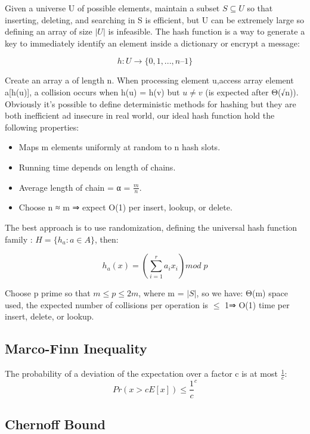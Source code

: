 Given a universe U of possible elements, maintain a subset $S \subseteq U$ so that inserting, deleting, and searching in S is efficient, but U can be extremely large so defining an array of size $| U |$ is infeasible.
The hash function is a way to generate a key to immediately identify an element inside a dictionary or encrypt a message:

\[h : U \rightarrow \{ 0, 1, ..., n – 1 \}\]

Create an array a of length n. When processing element u,access array element a[h(u)], a collision occurs when h(u) = h(v) but $u \neq v$ (is expected after Θ(√n)).\\
Obviously it's possible to define deterministic methods for hashing but they are both inefficient ad insecure in real world, our ideal hash function hold the following properties:\\

\begin{itemize}

    \item{Maps m elements uniformly at random to n hash slots.}
    \item{Running time depends on length of chains.}
    \item{Average length of chain = α = $\frac{m}{n}$.}
    \item{Choose n ≈ m ⇒ expect O(1) per insert, lookup, or delete.}

\end{itemize}

The best approach is to use randomization, defining the universal hash function family : $H = \{ h_{a} : a \in A \}$, then:

\[h_{a}(x) = (\sum_{i=1}^{r}a_{i}x_{i}) mod \;p\]

Choose p prime so that $m \leq p \leq 2m$, where m = $| S |$, so we have: Θ(m) space used, the expected number of collisions per operation is $\leq$ 1⇒ O(1) time per insert, delete, or lookup.

\subsection{Marco-Finn Inequality}
The probability of a deviation of the expectation over a factor c is at most $\frac{1}{c}$:
\[ Pr(x>cE[x]) \leq \frac{1}{c}^{c}\]

\subsection{Chernoff Bound}

